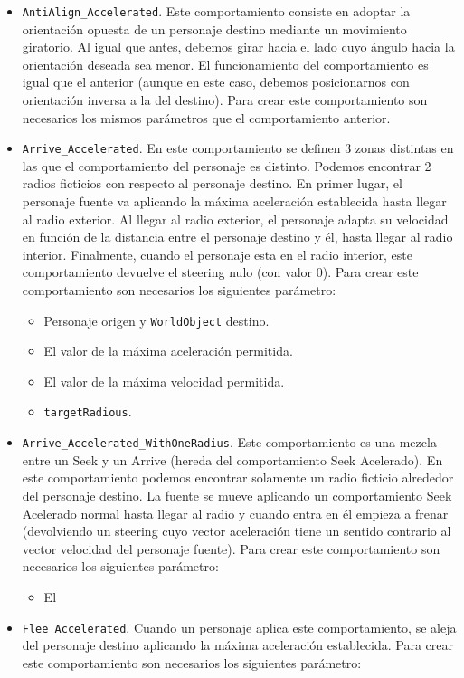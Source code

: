 \begin{itemize}
 \item \texttt{AntiAlign\_Accelerated}. Este comportamiento consiste en adoptar la orientación opuesta de un personaje destino mediante un movimiento giratorio. Al igual que antes, debemos girar hacía el lado cuyo ángulo hacia la orientación deseada sea menor. El funcionamiento del comportamiento es igual que el anterior (aunque en este caso, debemos posicionarnos con orientación inversa a la del destino). Para crear este comportamiento son necesarios los mismos parámetros que el comportamiento anterior.
 \item \texttt{Arrive\_Accelerated}. En este comportamiento se definen 3 zonas distintas en las que el comportamiento del personaje es distinto. Podemos encontrar 2 radios ficticios con respecto al personaje destino. En primer lugar, el personaje fuente va aplicando la máxima aceleración establecida hasta llegar al radio exterior. Al llegar al radio exterior, el personaje adapta su velocidad en función de la distancia entre el personaje destino y él, hasta llegar al radio interior. Finalmente, cuando el personaje esta en el radio interior, este comportamiento devuelve el steering nulo (con valor 0). Para crear este comportamiento son necesarios los siguientes parámetro:
 \begin{itemize}
 	\item Personaje origen y \texttt{WorldObject} destino.
 	\item El valor de la máxima aceleración permitida.
 	\item El valor de la máxima velocidad permitida.
 	\item \texttt{targetRadious}. 
 \end{itemize}
 \item \texttt{Arrive\_Accelerated\_WithOneRadius}. Este comportamiento es una mezcla entre un Seek y un Arrive (hereda del comportamiento Seek Acelerado). En este comportamiento podemos encontrar solamente un radio ficticio alrededor del personaje destino. La fuente se mueve aplicando un comportamiento Seek Acelerado normal hasta llegar al radio y cuando entra en él empieza a frenar (devolviendo un steering cuyo vector aceleración tiene un sentido contrario al vector velocidad del personaje fuente). Para crear este comportamiento son necesarios los siguientes parámetro:
 \begin{itemize}
 	\item El 
 \end{itemize}
 \item \texttt{Flee\_Accelerated}. Cuando un personaje aplica este comportamiento, se aleja del personaje destino aplicando la máxima aceleración establecida. Para crear este comportamiento son necesarios los siguientes parámetro:

\end{itemize}
